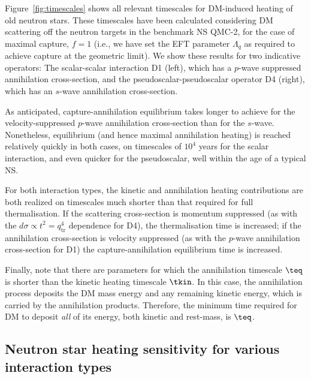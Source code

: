 Figure~\ref{fig:timescales} shows all relevant timescales for DM-induced heating of old neutron stars. These timescales have been calculated considering DM scattering off the neutron targets in the benchmark NS QMC-2, for the case of maximal capture, $f = 1$ (i.e., we have set the EFT parameter $\Lambda_q$ as required to achieve capture at the geometric limit).
We show these results for two indicative operators: The scalar-scalar interaction D1 (left), which has a $p$-wave suppressed annihilation cross-section, and the pseudoscalar-pseudoscalar operator D4 (right), which has an $s$-wave annihilation cross-section. 

As anticipated, capture-annihilation equilibrium takes longer to achieve for the velocity-suppressed $p$-wave annihilation cross-section than for the $s$-wave.  Nonetheless,  
equilibrium (and hence maximal annihilation heating) is reached relatively quickly in both cases, on timescales of $10^4$ years for the scalar interaction, and even quicker for the pseudoscalar, well within the age of a typical NS. 


For both interaction types, the kinetic and annihilation heating contributions are both realized on timescales much shorter than that required for full thermalisation. If the scattering cross-section is momentum suppressed (as with the $d\sigma \propto t^2=q_\text{tr}^4$ dependence for D4), the thermalisation time is increased; if the annihilation cross-section is velocity suppressed (as with the $p$-wave annihilation cross-section for D1) the capture-annihilation equilibrium time is increased.


 
Finally, note that there are parameters for which the annihilation timescale $\teq$ is shorter than the kinetic heating timescale $\tkin$. In this case, the annihilation process deposits the DM mass energy and any remaining kinetic energy, which is carried by the annihilation products. Therefore, the minimum time required for DM to deposit {\it all} of its energy, both kinetic and rest-mass, is $\teq$.


\subsection{Neutron star heating sensitivity for various interaction types}   
\label{ref:heatingresults}


